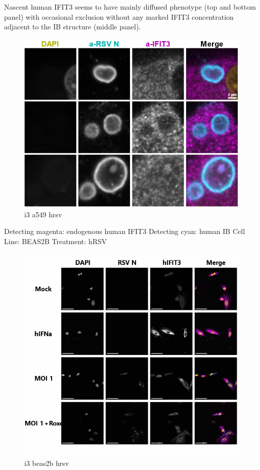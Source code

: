 Nascent human IFIT3 seems to have mainly diffused phenotype (top and bottom panel) with occasional exclusion without any marked IFIT3 concentration adjacent to the IB structure (middle panel).

\begin{figure}
    \centering
    \includegraphics[width=1\linewidth]{08. Chapter 3/Figs/04. IFIT3/02. a549 hrsv.png}
    \caption[i3 a549 hrsv]{i3 a549 hrsv}
    \label{i3 a549 hrsv}
\end{figure}

Detecting magenta: endogenous human IFIT3 \newline
Detecting cyan: human IB \newline
Cell Line: BEAS2B \newline
Treatment: hRSV \newline

\begin{figure}
    \centering
    \includegraphics[width=1\linewidth]{08. Chapter 3/Figs/04. IFIT3/03. beas2b hrsv.png}
    \caption[i3 beas2b hrsv]{i3 beas2b hrsv}
    \label{i3 beas2b hrsv}
\end{figure}

